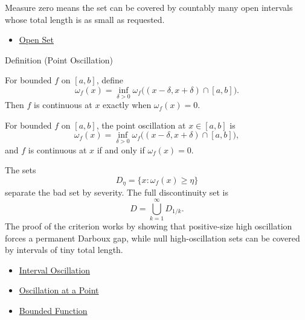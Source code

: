 \begin{remark*}[Interpretation]
Measure zero means the set can be covered by countably many open intervals
whose total length is as small as requested.
\end{remark*}

\begin{dependencies}
\begin{itemize}
  \item \hyperref[def:open-set]{Open Set}
\end{itemize}
\end{dependencies}

\begin{definitionbox}{Definition (Point Oscillation)}
\begin{definition}
\label{def:point-oscillation-integration}
For bounded \(f\) on \([a,b]\), define
\[
  \omega_f(x)=
  \inf_{\delta>0}
  \omega_f\bigl((x-\delta,x+\delta)\cap[a,b]\bigr).
\]
Then \(f\) is continuous at \(x\) exactly when \(\omega_f(x)=0\).
\end{definition}
\end{definitionbox}

\begin{remark*}
For bounded \(f\) on \([a,b]\), the point oscillation at \(x\in[a,b]\) is
\[
  \omega_f(x)=
  \inf_{\delta>0}
  \omega_f\bigl((x-\delta,x+\delta)\cap[a,b]\bigr),
\]
and \(f\) is continuous at \(x\) if and only if \(\omega_f(x)=0\).
\end{remark*}

\begin{remark*}[Interpretation]
The sets
\[
  D_\eta=\{x:\omega_f(x)\ge \eta\}
\]
separate the bad set by severity. The full discontinuity set is
\[
  D=\bigcup_{k=1}^{\infty}D_{1/k}.
\]
The proof of the criterion works by showing that positive-size high
oscillation forces a permanent Darboux gap, while null high-oscillation sets
can be covered by intervals of tiny total length.
\end{remark*}

\begin{dependencies}
\begin{itemize}
  \item \hyperref[def:interval-oscillation-integration]{Interval Oscillation}
  \item \hyperref[def:oscillation-at-a-point]{Oscillation at a Point}
  \item \hyperref[def:function-bounded]{Bounded Function}
\end{itemize}
\end{dependencies}

